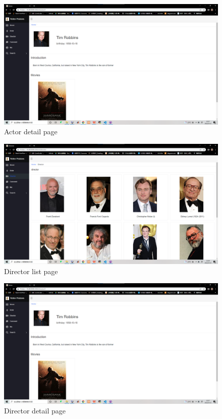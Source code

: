 \begin{CJK*}{UTF8}{gbsn}
\begin{figure}[htbp]
\centering
\includegraphics[width=1\textwidth]{res_actor2.png}
\caption{Actor detail page}
\end{figure}


\begin{figure}[htbp]
\centering
\includegraphics[width=1\textwidth]{res_dir1.png}
\caption{Director list page}
\end{figure}


\begin{figure}[htbp]
\centering
\includegraphics[width=1\textwidth]{res_actor2.png}
\caption{Director detail page}
\end{figure}


\end{CJK*}
